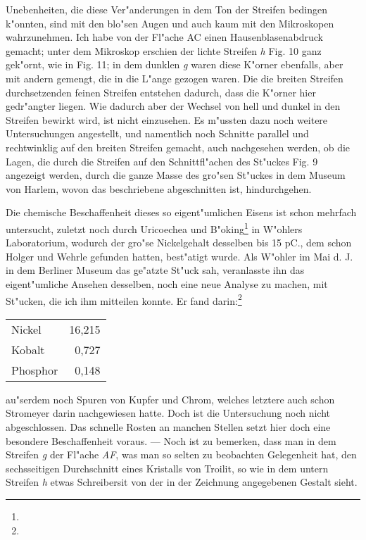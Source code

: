 \documentclass[a4paper, 11pt, oneside]{article}
\begin{document}
Unebenheiten, die diese Ver"anderungen in dem Ton der Streifen bedingen k"onnten, sind mit den blo"sen Augen und auch kaum mit den Mikroskopen wahrzunehmen. Ich habe von der Fl"ache AC einen Hausenblasenabdruck gemacht; unter dem Mikroskop erschien der lichte Streifen \emph{h} Fig. 10 ganz gek"ornt, wie in Fig. 11; in dem dunklen \emph{g} waren diese K"orner ebenfalls, aber mit andern gemengt, die in die L"ange gezogen waren. Die die breiten Streifen durchsetzenden feinen Streifen entstehen dadurch, dass die K"orner hier gedr"angter liegen. Wie dadurch aber der Wechsel von hell und dunkel in den Streifen bewirkt wird, ist nicht einzusehen. Es m"ussten dazu noch weitere Untersuchungen angestellt, und namentlich noch Schnitte parallel und rechtwinklig auf den breiten Streifen gemacht, auch nachgesehen werden, ob die Lagen, die durch die Streifen auf den Schnittfl"achen des St"uckes Fig. 9 angezeigt werden, durch die ganze Masse des gro"sen St"uckes in dem Museum von Harlem, wovon das beschriebene abgeschnitten ist, hindurchgehen.

Die chemische Beschaffenheit dieses so eigent"umlichen Eisens ist schon mehrfach untersucht, zuletzt noch durch Uricoechea und B"oking\footnote{} in W"ohlers Laboratorium, wodurch der gro"se Nickelgehalt desselben bis 15 pC., dem schon Holger und Wehrle gefunden hatten, best"atigt wurde. Als W"ohler im Mai d. J. in dem Berliner Museum das ge"atzte St"uck sah, veranlasste ihn das eigent"umliche Ansehen desselben, noch eine neue Analyse zu machen, mit St"ucken, die ich ihm mitteilen konnte. Er fand darin:\footnote{}
\begin{center}
\begin{tabular}{ l r }
    Nickel & 16,215\\
    Kobalt & 0,727\\
    Phosphor & 0,148\\
\end{tabular}
\end{center}
au"serdem noch Spuren von Kupfer und Chrom, welches letztere auch schon Stromeyer darin nachgewiesen hatte. Doch ist die Untersuchung noch nicht abgeschlossen. Das schnelle Rosten an manchen Stellen setzt hier doch eine besondere Beschaffenheit voraus. --- Noch ist zu bemerken, dass man in dem Streifen \emph{g} der Fl"ache \emph{AF}, was man so selten zu beobachten Gelegenheit hat, den sechsseitigen Durchschnitt eines Kristalls von Troilit, so wie in dem untern Streifen \emph{h} etwas Schreibersit von der in der Zeichnung angegebenen Gestalt sieht.
\end{document}
